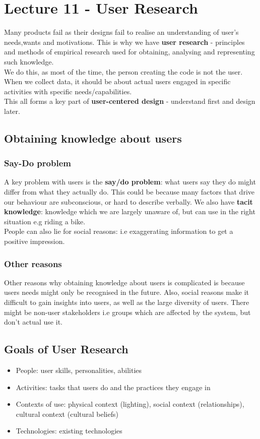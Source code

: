 \documentclass{article}
\begin{document}
\section{Lecture 11 - User Research}
Many products fail as their designs fail to realise an understanding of user's needs,wants and motivations. This is why we have \textbf{user research} - principles and methods of empirical research used for obtaining, analysing and representing such knowledge. \\
We do this, as most of the time, the person creating the code is not the user. When we collect data, it should be about actual users engaged in specific activities with specific needs/capabilities. \\ This all forms a key part of \textbf{user-centered design} - understand first and design later. 
\subsection{Obtaining knowledge about users}
\subsubsection{Say-Do problem}
A key problem with users is the \textbf{say/do problem}: what users say they do might differ from what they actually do. This could be because many factors that drive our behaviour are subconscious, or hard to describe verbally. We also have \textbf{tacit knowledge}: knowledge which we are largely unaware of, but can use in the right situation e.g riding a bike. \\
People can also lie for social reasons: i.e exaggerating information to get a positive impression.
\subsubsection{Other reasons}
Other reasons why obtaining knowledge about users is complicated is because users needs might only be recognised in the future. Also, social reasons make it difficult to gain insights into users, as well as the large diversity of users. There might be non-user stakeholders i.e groups which are affected by the system, but don't actual use it.
\subsection{Goals of User Research}
\begin{itemize}
    \item People: user skills, personalities, abilities
    \item Activities: tasks that users do and the practices they engage in
    \item Contexts of use: physical context (lighting), social context (relationships), cultural context (cultural beliefs)
    \item Technologies: existing technologies
\end{itemize}
\end{document}
